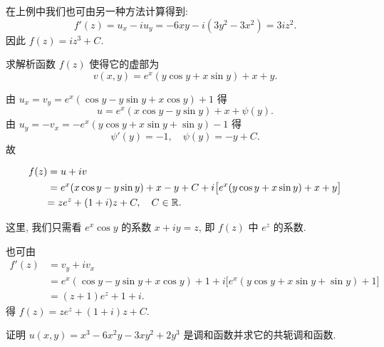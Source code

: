 在上例中我们也可由另一种方法计算得到:
\[f'(z)=u_x-iu_y=-6xy-i(3y^2-3x^2)=3iz^2.\]
因此 $f(z)=iz^3+C$.

\begin{example}
	求解析函数 $f(z)$ 使得它的虚部为
	\[v(x,y)=e^x(y\cos y+x\sin y)+x+y.\]
\end{example}

\begin{solution}
	由 $u_x=v_y=e^x(\cos y-y\sin y+x\cos y)+1$ 得
	\[u=e^x(x\cos y-y\sin y)+x+\psi(y).\]
	{由 $u_y=-v_x=-e^x(y\cos y+x\sin y+\sin y)-1$ 得
	\[\psi'(y)=-1,\quad\psi(y)=-y+C.\]}
	故

	\begin{align*}
		f(z)&=u+iv\\
		&=e^x(x\cos y-y\sin y)+x-y+C
		+i\bigl[e^x(y\cos y+x\sin y)+x+y\bigr]\\
		&{=ze^z+(1+i)z+C,\quad C\in{\mathbb{R}}.}
	\end{align*}
\end{solution}
这里, 我们只需看 $e^x\cos y$ 的系数 $x+iy=z$, 即 $f(z)$ 中 $e^z$ 的系数.

也可由
\begin{align*}
	f'(z)&=v_y+iv_x\\
	&=e^x(\cos y-y\sin y+x\cos y)+1
	+i\bigl[e^x(y\cos y+x\sin y+\sin y)+1\bigr]\\
	&{=(z+1)e^z+1+i.}
\end{align*}
得 $f(z)=ze^z+(1+i)z+C$.
\begin{exercise}
	证明 $u(x,y)=x^3-6x^2y-3xy^2+2y^3$ 是调和函数并求它的共轭调和函数.
\end{exercise}



